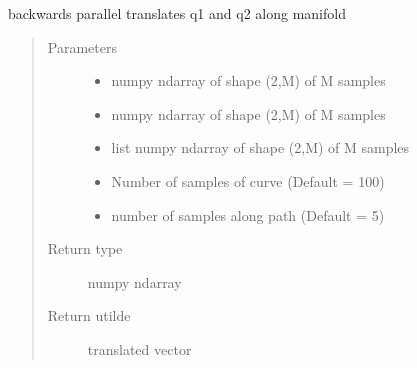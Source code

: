 \documentclass[letterpaper,10pt,english]{sphinxmanual}
\begin{document}
\begin{fulllineitems}
\label{\detokenize{geodesic:geodesic.back_parallel_transport}}
backwards parallel translates q1 and q2 along manifold
\begin{quote}\begin{description}
\item[{Parameters}] \leavevmode\begin{itemize}
\item {} 
 \textendash{} numpy ndarray of shape (2,M) of M samples

\item {} 
 \textendash{} numpy ndarray of shape (2,M) of M samples

\item {} 
 \textendash{} list numpy ndarray of shape (2,M) of M samples

\item {} 
 \textendash{} Number of samples of curve (Default = 100)

\item {} 
 \textendash{} number of samples along path (Default = 5)

\end{itemize}

\item[{Return type}] \leavevmode
numpy ndarray

\item[{Return utilde}] \leavevmode
translated vector

\end{description}\end{quote}

\end{fulllineitems}

\end{document}
